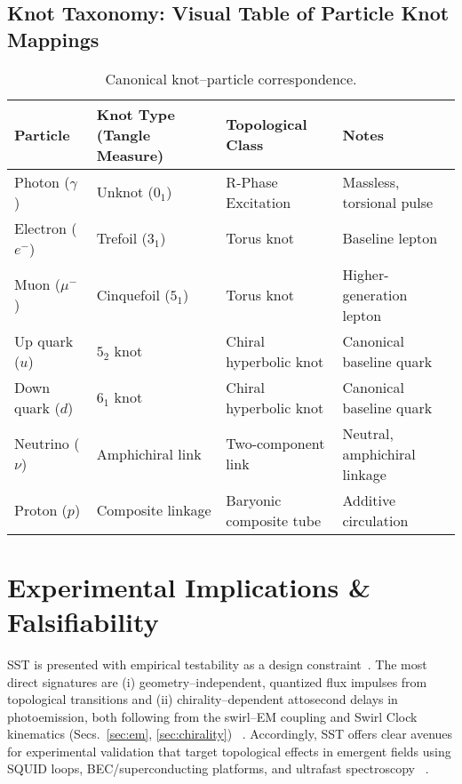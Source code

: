 \documentclass[10pt,reprint,aps,onecolumn,nofootinbib]{revtex4-2}
\begin{document}
    \subsection*{Knot Taxonomy: Visual Table of Particle Knot Mappings}
        \begin{table}[h!]\label{tab:knotetable}
            \centering
            \small
            \begin{adjustbox}{max width=\textwidth}
                \begin{tabular}{|l|l|l|l|}
                    \hline
                        \textbf{Particle} & \textbf{Knot Type (Tangle Measure)} & \textbf{Topological Class} & \textbf{Notes} \\
                    \hline
                        Photon ($\gamma$) & Unknot ($0_1$) & R-Phase Excitation & Massless, torsional pulse~ \cite{sstCanon, sstLagrangian} \\
                        Electron ($e^-$) & Trefoil ($3_1$) & Torus knot & Baseline lepton~ \cite{sstCanon, sstLagrangian} \\
                        Muon ($\mu^-$) & Cinquefoil ($5_1$) & Torus knot & Higher-generation lepton~ \cite{sstLagrangian} \\
                        Up quark ($u$) & $5_2$ knot & Chiral hyperbolic knot & Canonical baseline quark~ \cite{sstCanon, sstLagrangian} \\
                        Down quark ($d$) & $6_1$ knot & Chiral hyperbolic knot & Canonical baseline quark~ \cite{sstCanon, sstLagrangian4} \\
                        Neutrino ($\nu$) & Amphichiral link & Two-component link & Neutral, amphichiral linkage~ \cite{sstLagrangian} \\
                        Proton ($p$) & Composite linkage & Baryonic composite tube & Additive circulation~ \cite{chiralSwirl} \\
                    \hline
                \end{tabular}
            \end{adjustbox}
            \caption{Canonical knot–particle correspondence.}
        \end{table}

\section{Experimental Implications \& Falsifiability}\label{sec:falsifiability}
SST is presented with empirical testability as a design constraint~\cite{Hossenfelder2018}. The most direct signatures are (i) geometry–independent, quantized flux impulses from topological transitions and (ii) chirality–dependent attosecond delays in photoemission, both following from the swirl–EM coupling and Swirl Clock kinematics (Secs.~\ref{sec:em}, \ref{sec:chirality})~ \cite{EM_G}. Accordingly, SST offers clear avenues for experimental validation that target topological effects in emergent fields using SQUID loops, BEC/superconducting platforms, and ultrafast spectroscopy~ \cite{EM_G}.
\end{document}
